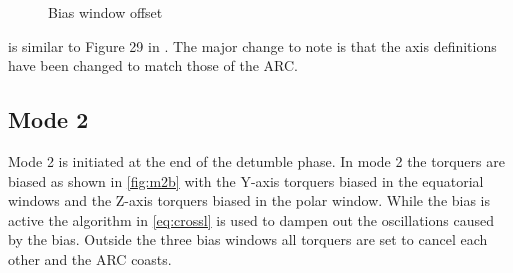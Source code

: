 \begin{figure}[htb!]
    \caption{Bias window offset}
    \label{fig:winplace}
\end{figure}

 is similar to Figure 29 in \cite{Mentch11}. The major change to note is that the axis definitions have been changed to match those of the \ac{ARC}.

\subsection{Mode 2}

Mode 2 is initiated at the end of the detumble phase. In mode 2 the torquers are biased as shown in \cref{fig:m2b} with the Y-axis torquers biased in the equatorial windows and the Z-axis torquers biased in the polar window. While the bias is active the algorithm in \cref{eq:crossl} is used to dampen out the oscillations caused by the bias. Outside the three bias windows all torquers are set to cancel each other and the \ac{ARC} coasts.

